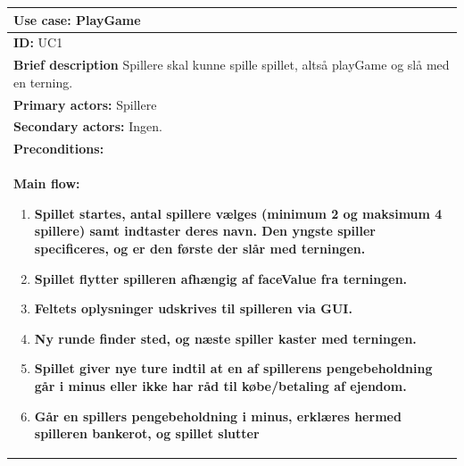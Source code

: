 \begin{table}[H]
    \begin{center}
        \begin{tabular}{ | p{15cm} |}
            \hline
            \textbf{Use case:} PlayGame \\ \hline
            \textbf{ID:} UC1 \\ \hline
            \textbf{Brief description} 
            Spillere skal kunne spille spillet, altså playGame og slå med en terning.     \\ \hline
            \textbf{Primary actors:} Spillere \\ \hline
            \textbf{Secondary actors:} Ingen. \\ \hline
            \textbf{Preconditions:}      \\ \hline
            \textbf{Main flow:}
            \begin{enumerate}
                \item \textbf{Spillet startes, antal spillere vælges (minimum 2 og maksimum 4 spillere) samt indtaster deres navn. Den yngste spiller specificeres, og er den første der slår med terningen.}
                \item \textbf{Spillet flytter spilleren afhængig af faceValue fra terningen.}
                \item \textbf{Feltets oplysninger udskrives til spilleren via GUI.}
                \item \textbf{Ny runde finder sted, og næste spiller kaster med terningen.}
                \item \textbf{Spillet giver nye ture indtil at en af spillerens pengebeholdning går i minus eller ikke har råd til købe/betaling af ejendom.}
                \item \textbf{Går en spillers pengebeholdning i minus, erklæres hermed spilleren bankerot, og spillet slutter}
            \end{enumerate} \\ \hline

            \end{tabular}
            \end{center}
             \end{table}


